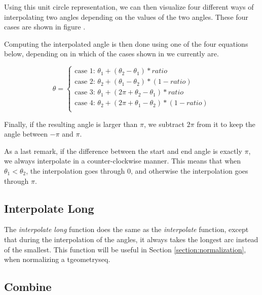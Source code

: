 
Using this unit circle representation, we can then visualize four different ways of interpolating two angles depending on the values of the two angles. These four cases are shown in figure .


Computing the interpolated angle is then done using one of the four equations below, depending on in which of the cases shown in  we currently are.

\[
    \theta = 
    \begin{cases}
        \text{case 1: } \theta_1 + (\theta_2 - \theta_1)*ratio \\
        \text{case 2: } \theta_2 + (\theta_1 - \theta_2)*(1 - ratio) \\
        \text{case 3: } \theta_1 + (2\pi + \theta_2 - \theta_1)*ratio \\
        \text{case 4: } \theta_2 + (2\pi + \theta_1 - \theta_2)*(1 - ratio) \\
    \end{cases}
\]

Finally, if the resulting angle is larger than $\pi$, we subtract $2\pi$ from it to keep the angle between $-\pi$ and $\pi$.

As a last remark, if the difference between the start and end angle is exactly $\pi$, we always interpolate in a counter-clockwise manner. This means that when $\theta_1 < \theta_2$, the interpolation goes through $0$, and otherwise the interpolation goes through $\pi$.


\subsection{Interpolate Long}
\label{section:interpolate_long}

The \textit{interpolate long} function does the same as the \textit{interpolate} function, except that during the interpolation of the angles, it always takes the longest arc instead of the smallest. This function will be useful in Section \ref{section:normalization}, when normalizing a tgeometryseq.

\subsection{Combine}
\label{section:combine}


